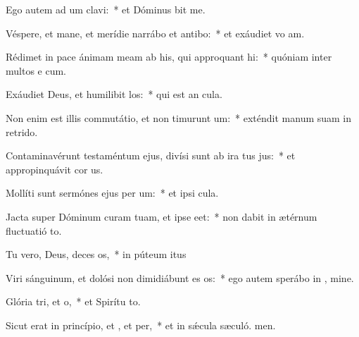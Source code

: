 \item Ego autem ad um clavi:~* et Dóminus bit me.
\item Véspere, et mane, et merídie narrábo et antibo:~* et exáudiet vo am.
\item Rédimet in pace ánimam meam ab his, qui approquant hi:~* quóniam inter multos e cum.
\item Exáudiet Deus, et humilibit los:~* qui est an cula.
\item Non enim est illis commutátio, et non timurunt um:~* exténdit manum suam in retrido.
\item Contaminavérunt testaméntum ejus, divísi sunt ab ira tus jus:~* et appropinquávit cor us.
\item Mollíti sunt sermónes ejus per um:~* et ipsi  cula.
\item Jacta super Dóminum curam tuam, et ipse  eet:~* non dabit in ætérnum fluctuatió to.
\item Tu vero, Deus, deces os,~* in púteum itus
\item Viri sánguinum, et dolósi non dimidiábunt es os:~* ego autem sperábo in , mine.
\item Glória tri, et o,~* et Spirítu to.
\item Sicut erat in princípio, et , et per,~* et in sǽcula sæculó. men.
